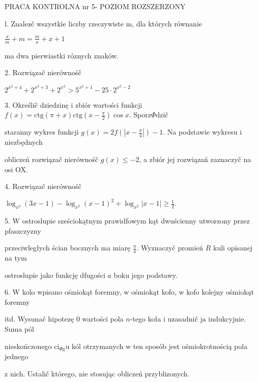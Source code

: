 \documentclass[a4paper,12pt]{article}
\begin{document}
PRACA KONTROLNA nr 5- POZIOM ROZSZERZONY

l. Znalez$\acute{}$č wszystkie liczby rzeczywiste m, dla których równanie

$\displaystyle \frac{x}{m}+m=\frac{m}{x}+x+1$

ma dwa pierwiastki róznych znaków.

2. Rozwiązač nierównośč

$2^{x^{2}+4}+2^{x^{2}+3}+2^{x^{2}}>5^{x^{2}+1}-25\cdot 2^{x^{2}-2}$

3. Określič dziedzinę $\mathrm{i}$ zbiór wartości funkcji $f(x)=\displaystyle \mathrm{c}\mathrm{t}\mathrm{g}(\pi+x)\mathrm{c}\mathrm{t}\mathrm{g}(x-\frac{\pi}{2})\cos x$. Sporz$\Phi$dzič

staranny wykres funkcji $g(x) =2f(|x-\displaystyle \frac{\pi}{4}|)-1$. Na podstawie wykresu $\mathrm{i}$ niezbędnych

obliczeń rozwiązač nierównośč $g(x)\leq-2$, a zbiór jej rozwiązań zaznaczyč na osi OX.

4. Rozwiązač nierównośč

$\displaystyle \log_{x^{2}}(3x-1)-\log_{x^{2}}(x-1)^{2}+\log_{x^{2}}|x-1|\geq\frac{1}{2}.$

5. $\mathrm{W}$ ostroslupie sześciokątnym prawidfowym kąt dwuścienny utworzony przez pfaszczyzny

przeciwległych ścian bocznych ma miarę $\displaystyle \frac{\pi}{4}$. Wyznaczyč promień $R$ kuli opisanej na tym

ostroslupie jako funkcję dfugości $a$ boku jego podstawy.

6. $\mathrm{W}$ kolo wpisano ośmiokąt foremny, $\mathrm{w}$ ośmiokąt kofo, $\mathrm{w}$ kofo kolejny ośmiokąt foremny

itd. Wysunač hipotezę $0$ wartości pola $n$-tego koła $\mathrm{i}$ uzasadnič $\mathrm{j}\mathrm{a}$ indukcyjnie. Suma pól

nieskończonego $\mathrm{c}\mathrm{i}_{\Phi \mathrm{g}}\mathrm{u}$ kól otrzymanych $\mathrm{w}$ ten sposób jest ośmiokrotnością pola jednego

$\mathrm{z}$ nich. Ustalič którego, nie stosując obliczeń przyblizonych.
\end{document}
